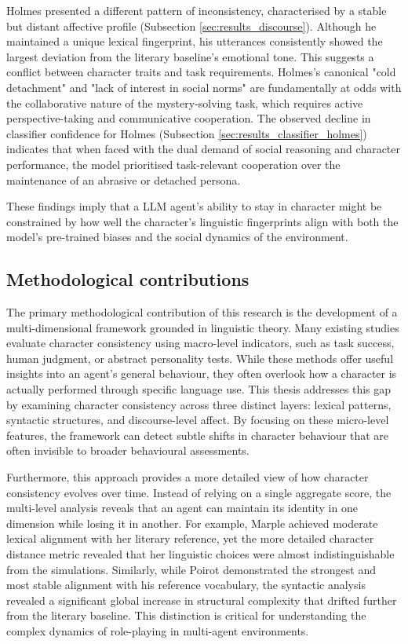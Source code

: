 \documentclass{article}
\begin{document}
Holmes presented a different pattern of inconsistency, characterised by a stable but distant affective profile (Subsection \ref{sec:results_discourse}). Although he maintained a unique lexical fingerprint, his utterances consistently showed the largest deviation from the literary baseline's emotional tone. This suggests a conflict between character traits and task requirements. Holmes's canonical "cold detachment" and "lack of interest in social norms" are fundamentally at odds with the collaborative nature of the mystery-solving task, which requires active perspective-taking and communicative cooperation. The observed decline in classifier confidence for Holmes (Subsection \ref{sec:results_classifier_holmes}) indicates that when faced with the dual demand of social reasoning and character performance, the model prioritised task-relevant cooperation over the maintenance of an abrasive or detached persona. 
 
These findings imply that a LLM agent's ability to stay in character might be constrained by how well the character's linguistic fingerprints align with both the model's pre-trained biases and the social dynamics of the environment.


\subsection{Methodological contributions}

The primary methodological contribution of this research is the development of a multi-dimensional framework grounded in linguistic theory. Many existing studies evaluate character consistency using macro-level indicators, such as task success, human judgment, or abstract personality tests. While these methods offer useful insights into an agent's general behaviour, they often overlook how a character is actually performed through specific language use. This thesis addresses this gap by examining character consistency across three distinct layers: lexical patterns, syntactic structures, and discourse-level affect. By focusing on these micro-level features, the framework can detect subtle shifts in character behaviour that are often invisible to broader behavioural assessments. 

Furthermore, this approach provides a more detailed view of how character consistency evolves over time. Instead of relying on a single aggregate score, the multi-level analysis reveals that an agent can maintain its identity in one dimension while losing it in another. For example, Marple achieved moderate lexical alignment with her literary reference, yet the more detailed character distance metric revealed that her linguistic choices were almost indistinguishable from the simulations. Similarly, while Poirot demonstrated the strongest and most stable alignment with his reference vocabulary, the syntactic analysis revealed a significant global increase in structural complexity that drifted further from the literary baseline. This distinction is critical for understanding the complex dynamics of role-playing in multi-agent environments.
\end{document}

